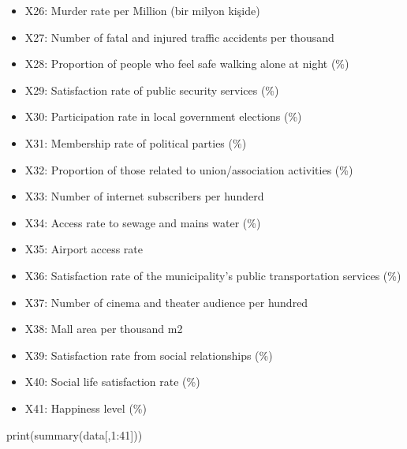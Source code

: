 \documentclass[12pt,twoside]{deuthesis}
\newenvironment{Shaded}{\begin{snugshade}}{\end{snugshade}}
\newcommand{\DecValTok}[1]{\textcolor[rgb]{0.00,0.00,0.81}{#1}}
\newcommand{\FunctionTok}[1]{\textcolor[rgb]{0.00,0.00,0.00}{#1}}
\newcommand{\NormalTok}[1]{#1}
\newcommand{\SpecialCharTok}[1]{\textcolor[rgb]{0.00,0.00,0.00}{#1}}
\begin{document}
\begin{itemize}
\item
  X26: Murder rate per Million (bir milyon kişide)
\item
  X27: Number of fatal and injured traffic accidents per thousand
\item
  X28: Proportion of people who feel safe walking alone at night (\%)
\item
  X29: Satisfaction rate of public security services (\%)
\item
  X30: Participation rate in local government elections (\%)
\item
  X31: Membership rate of political parties (\%)
\item
  X32: Proportion of those related to union/association activities (\%)
\item
  X33: Number of internet subscribers per hunderd
\item
  X34: Access rate to sewage and mains water (\%)
\item
  X35: Airport access rate
\item
  X36: Satisfaction rate of the municipality's public transportation services (\%)
\item
  X37: Number of cinema and theater audience per hundred
\item
  X38: Mall area per thousand m2
\item
  X39: Satisfaction rate from social relationships (\%)
\item
  X40: Social life satisfaction rate (\%)
\item
  X41: Happiness level (\%)
\end{itemize}
\begin{Shaded}
\begin{Highlighting}[]
\FunctionTok{print}\NormalTok{(}\FunctionTok{summary}\NormalTok{(data[,}\DecValTok{1}\SpecialCharTok{:}\DecValTok{41}\NormalTok{]))}
\end{Highlighting}
\end{Shaded}
\end{document}
